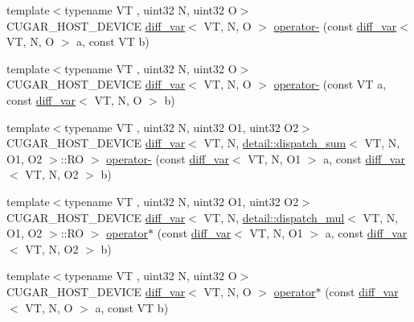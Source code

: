 \begin{DoxyCompactItemize}
\item 
{\footnotesize template$<$typename VT , uint32 N, uint32 O$>$ }\\C\+U\+G\+A\+R\+\_\+\+H\+O\+S\+T\+\_\+\+D\+E\+V\+I\+CE \hyperlink{structcugar_1_1diff__var}{diff\+\_\+var}$<$ VT, N, O $>$ \hyperlink{group___auto_diff_module_ga6052727ad3520694d4a37db71532423c}{operator-\/} (const \hyperlink{structcugar_1_1diff__var}{diff\+\_\+var}$<$ VT, N, O $>$ a, const VT b)
\item 
{\footnotesize template$<$typename VT , uint32 N, uint32 O$>$ }\\C\+U\+G\+A\+R\+\_\+\+H\+O\+S\+T\+\_\+\+D\+E\+V\+I\+CE \hyperlink{structcugar_1_1diff__var}{diff\+\_\+var}$<$ VT, N, O $>$ \hyperlink{group___auto_diff_module_ga57d83c9449b450f1a1b3d655bb92ef24}{operator-\/} (const VT a, const \hyperlink{structcugar_1_1diff__var}{diff\+\_\+var}$<$ VT, N, O $>$ b)
\item 
{\footnotesize template$<$typename VT , uint32 N, uint32 O1, uint32 O2$>$ }\\C\+U\+G\+A\+R\+\_\+\+H\+O\+S\+T\+\_\+\+D\+E\+V\+I\+CE \hyperlink{structcugar_1_1diff__var}{diff\+\_\+var}$<$ VT, N, \hyperlink{structcugar_1_1detail_1_1dispatch__sum}{detail\+::dispatch\+\_\+sum}$<$ VT, N, O1, O2 $>$\+::RO $>$ \hyperlink{group___auto_diff_module_ga19939d139dd82ec7e4bc93925af5b2d0}{operator-\/} (const \hyperlink{structcugar_1_1diff__var}{diff\+\_\+var}$<$ VT, N, O1 $>$ a, const \hyperlink{structcugar_1_1diff__var}{diff\+\_\+var}$<$ VT, N, O2 $>$ b)
\item 
{\footnotesize template$<$typename VT , uint32 N, uint32 O1, uint32 O2$>$ }\\C\+U\+G\+A\+R\+\_\+\+H\+O\+S\+T\+\_\+\+D\+E\+V\+I\+CE \hyperlink{structcugar_1_1diff__var}{diff\+\_\+var}$<$ VT, N, \hyperlink{structcugar_1_1detail_1_1dispatch__mul}{detail\+::dispatch\+\_\+mul}$<$ VT, N, O1, O2 $>$\+::RO $>$ \hyperlink{group___auto_diff_module_ga1c7e88173ec4218a2a3f7545bc60c665}{operator$\ast$} (const \hyperlink{structcugar_1_1diff__var}{diff\+\_\+var}$<$ VT, N, O1 $>$ a, const \hyperlink{structcugar_1_1diff__var}{diff\+\_\+var}$<$ VT, N, O2 $>$ b)
\item 
{\footnotesize template$<$typename VT , uint32 N, uint32 O$>$ }\\C\+U\+G\+A\+R\+\_\+\+H\+O\+S\+T\+\_\+\+D\+E\+V\+I\+CE \hyperlink{structcugar_1_1diff__var}{diff\+\_\+var}$<$ VT, N, O $>$ \hyperlink{group___auto_diff_module_ga4e23b0400e7f6f9335b35f739dcc8452}{operator$\ast$} (const \hyperlink{structcugar_1_1diff__var}{diff\+\_\+var}$<$ VT, N, O $>$ a, const VT b)

\end{DoxyCompactItemize}
